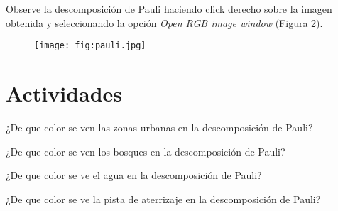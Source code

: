 \begin{figure}[h!]
    \centering
    \hfill
    \caption{}
    \label{fig:pauli}
\end{figure}

Observe la descomposición de Pauli haciendo click derecho sobre la imagen obtenida y seleccionando la opción \emph{Open RGB image window} (Figura \ref{fig:pauli}).

\begin{figure}[h!]
    \centering
    \texttt{[image: fig:pauli.jpg]}
    \caption{}
    \label{fig:pauli}
\end{figure}

\section{Actividades}

\begin{que}
    ¿De que color se ven las zonas urbanas en la descomposición de Pauli?
\end{que}

\begin{que}
    ¿De que color se ven los bosques en la descomposición de Pauli?
\end{que}

\begin{que}
    ¿De que color se ve el agua en la descomposición de Pauli?
\end{que}

\begin{que}
    ¿De que color se ve la pista de aterrizaje en la descomposición de Pauli?
\end{que}
